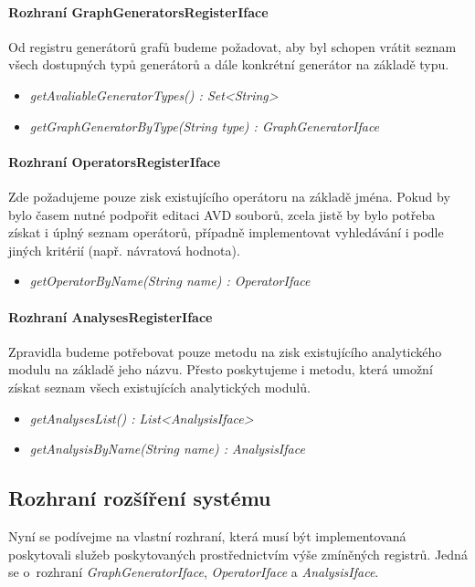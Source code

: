 \paragraph{Rozhraní GraphGeneratorsRegisterIface} Od registru generátorů grafů budeme požadovat, aby byl schopen vrátit seznam všech dostupných typů generátorů a dále konkrétní generátor na základě typu.
\begin{itemize}
\item \emph{getAvaliableGeneratorTypes() : Set<String>}
\item \emph{getGraphGeneratorByType(String type) : GraphGeneratorIface}
\end{itemize}

\paragraph{Rozhraní OperatorsRegisterIface}
Zde požadujeme pouze zisk existujícího operátoru na základě jména. Pokud by bylo časem nutné podpořit editaci AVD souborů, zcela jistě by bylo potřeba získat i úplný seznam operátorů, případně implementovat vyhledávání i podle jiných kritérií (např. návratová hodnota).

\begin{itemize}
\item \emph{getOperatorByName(String name) : OperatorIface}
\end{itemize}

\paragraph{Rozhraní AnalysesRegisterIface} Zpravidla budeme potřebovat pouze metodu na zisk existujícího analytického modulu na základě jeho názvu. Přesto poskytujeme i metodu, která umožní získat seznam všech existujících analytických modulů.

\begin{itemize}
\item \emph{getAnalysesList() : List<AnalysisIface>}
\item \emph{getAnalysisByName(String name) : AnalysisIface}
\end{itemize}

\subsection{Rozhraní rozšíření systému}

Nyní se podívejme na vlastní rozhraní, která musí být implementovaná poskytovali služeb poskytovaných prostřednictvím výše zmíněných registrů. Jedná se o~rozhraní \emph{GraphGeneratorIface}, \emph{OperatorIface} a \emph{AnalysisIface}.


